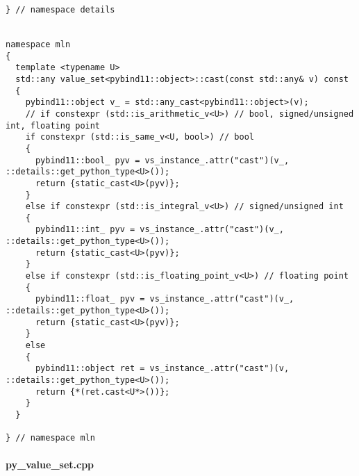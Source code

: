 \begin{verbatim}
} // namespace details


namespace mln
{
  template <typename U>
  std::any value_set<pybind11::object>::cast(const std::any& v) const
  {
    pybind11::object v_ = std::any_cast<pybind11::object>(v);
    // if constexpr (std::is_arithmetic_v<U>) // bool, signed/unsigned int, floating point
    if constexpr (std::is_same_v<U, bool>) // bool
    {
      pybind11::bool_ pyv = vs_instance_.attr("cast")(v_, ::details::get_python_type<U>());
      return {static_cast<U>(pyv)};
    }
    else if constexpr (std::is_integral_v<U>) // signed/unsigned int
    {
      pybind11::int_ pyv = vs_instance_.attr("cast")(v_, ::details::get_python_type<U>());
      return {static_cast<U>(pyv)};
    }
    else if constexpr (std::is_floating_point_v<U>) // floating point
    {
      pybind11::float_ pyv = vs_instance_.attr("cast")(v_, ::details::get_python_type<U>());
      return {static_cast<U>(pyv)};
    }
    else
    {
      pybind11::object ret = vs_instance_.attr("cast")(v, ::details::get_python_type<U>());
      return {*(ret.cast<U*>())};
    }
  }

} // namespace mln
\end{verbatim}

\paragraph{py\_value\_set.cpp}
\label{appendix:static-dynamic-bridge.mm.vs.py_value_set.cpp}

